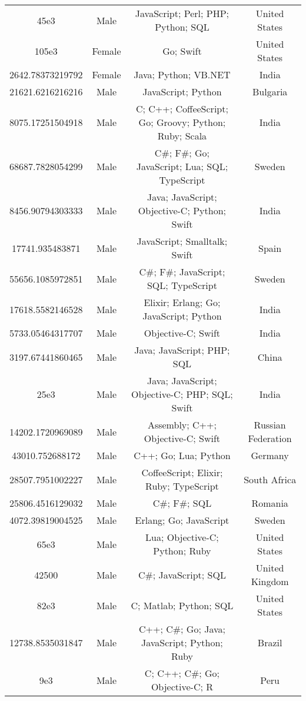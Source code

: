 \begin{center}
\begin{tabular}{ |c|c|c|c| }
45e3  &  Male  &  JavaScript; Perl; PHP; Python; SQL  &  United States  \\ 
105e3  &  Female  &  Go; Swift  &  United States  \\ 
2642.78373219792  &  Female  &  Java; Python; VB.NET  &  India  \\ 
21621.6216216216  &  Male  &  JavaScript; Python  &  Bulgaria  \\ 
8075.17251504918  &  Male  &  C; C++; CoffeeScript; Go; Groovy; Python; Ruby; Scala  &  India  \\ 
68687.7828054299  &  Male  &  C\#; F\#; Go; JavaScript; Lua; SQL; TypeScript  &  Sweden  \\ 
8456.90794303333  &  Male  &  Java; JavaScript; Objective-C; Python; Swift  &  India  \\ 
17741.935483871  &  Male  &  JavaScript; Smalltalk; Swift  &  Spain  \\ 
55656.1085972851  &  Male  &  C\#; F\#; JavaScript; SQL; TypeScript  &  Sweden  \\ 
17618.5582146528  &  Male  &  Elixir; Erlang; Go; JavaScript; Python  &  India  \\ 
5733.05464317707  &  Male  &  Objective-C; Swift  &  India  \\ 
3197.67441860465  &  Male  &  Java; JavaScript; PHP; SQL  &  China  \\ 
25e3  &  Male  &  Java; JavaScript; Objective-C; PHP; SQL; Swift  &  India  \\ 
14202.1720969089  &  Male  &  Assembly; C++; Objective-C; Swift  &  Russian Federation  \\ 
43010.752688172  &  Male  &  C++; Go; Lua; Python  &  Germany  \\ 
28507.7951002227  &  Male  &  CoffeeScript; Elixir; Ruby; TypeScript  &  South Africa  \\ 
25806.4516129032  &  Male  &  C\#; F\#; SQL  &  Romania  \\ 
4072.39819004525  &  Male  &  Erlang; Go; JavaScript  &  Sweden  \\ 
65e3  &  Male  &  Lua; Objective-C; Python; Ruby  &  United States  \\ 
42500  &  Male  &  C\#; JavaScript; SQL  &  United Kingdom  \\ 
82e3  &  Male  &  C; Matlab; Python; SQL  &  United States  \\ 
12738.8535031847  &  Male  &  C++; C\#; Go; Java; JavaScript; Python; Ruby  &  Brazil  \\ 
9e3  &  Male  &  C; C++; C\#; Go; Objective-C; R  &  Peru  \\ 

\end{tabular}
\end{center}
